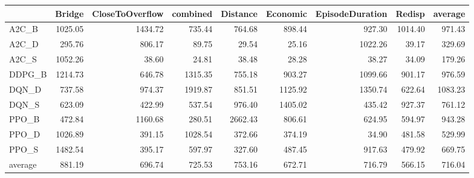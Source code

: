 \begin{tabular}{lrrrrrrrr}
\toprule
{} &   Bridge &  CloseToOverflow &  combined &  Distance &  Economic &  EpisodeDuration &   Redisp &  average \\
\midrule
A2C\_B   &  1025.05 &          1434.72 &    735.44 &    764.68 &    898.44 &           927.30 &  1014.40 &   971.43 \\
A2C\_D   &   295.76 &           806.17 &     89.75 &     29.54 &     25.16 &          1022.26 &    39.17 &   329.69 \\
A2C\_S   &  1052.26 &            38.60 &     24.81 &     38.48 &     28.28 &            38.27 &    34.09 &   179.26 \\
DDPG\_B  &  1214.73 &           646.78 &   1315.35 &    755.18 &    903.27 &          1099.66 &   901.17 &   976.59 \\
DQN\_D   &   737.58 &           974.37 &   1919.87 &    851.51 &   1125.92 &          1350.74 &   622.64 &  1083.23 \\
DQN\_S   &   623.09 &           422.99 &    537.54 &    976.40 &   1405.02 &           435.42 &   927.37 &   761.12 \\
PPO\_B   &   472.84 &          1160.68 &    280.51 &   2662.43 &    806.61 &           624.95 &   594.97 &   943.28 \\
PPO\_D   &  1026.89 &           391.15 &   1028.54 &    372.66 &    374.19 &            34.90 &   481.58 &   529.99 \\
PPO\_S   &  1482.54 &           395.17 &    597.97 &    327.60 &    487.45 &           917.63 &   479.92 &   669.75 \\
average &   881.19 &           696.74 &    725.53 &    753.16 &    672.71 &           716.79 &   566.15 &   716.04 \\
\bottomrule
\end{tabular}
